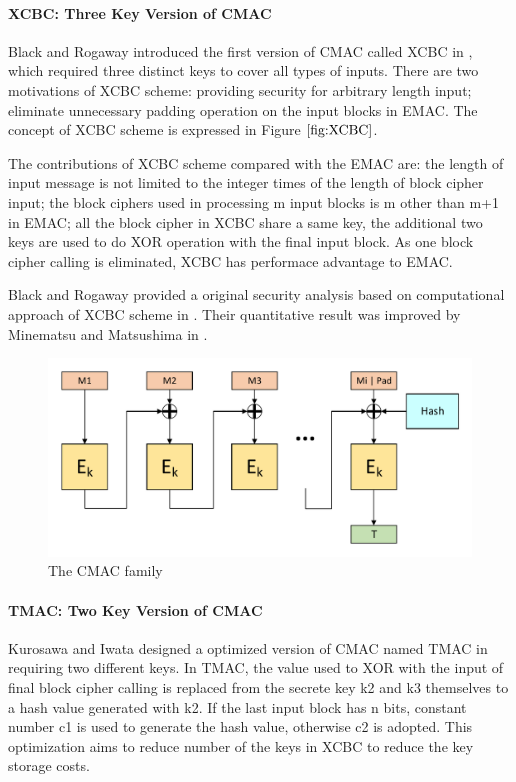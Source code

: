 \documentclass{article}
\begin{document}
\paragraph{XCBC: Three Key Version of CMAC}
Black and Rogaway introduced the first version of CMAC called XCBC in \cite{xcbc}, which required three distinct keys to cover all types of inputs.
There are two motivations of XCBC scheme: providing security for arbitrary length input; eliminate unnecessary padding operation on the input blocks in EMAC. The concept of XCBC scheme is expressed in Figure $\ref{fig:XCBC}$.

The contributions of XCBC scheme compared with the EMAC are: the length of input message is not limited to the integer times of the length of block cipher input; the block ciphers used in processing m input blocks is m other than m+1 in EMAC; all the block cipher in XCBC share a same key, the additional two keys are used to do XOR operation with the final input block. As one block cipher calling is eliminated, XCBC has performace advantage to EMAC.   

Black and Rogaway provided a original security analysis based on computational approach of XCBC scheme in \cite{xcbc}. Their quantitative result was improved by Minematsu and Matsushima in \cite{new}. 

\begin{figure}[htbp]
\centering
\includegraphics[scale=0.5]{./diagrams/cmac.pdf}
\caption{The CMAC family}
\label{fig:TMAC}
\end{figure}
\paragraph{TMAC: Two Key Version of CMAC}
Kurosawa and Iwata designed a optimized version of CMAC named TMAC in \cite{tmac} requiring two different keys.  
In TMAC,  the value used to XOR with the input of final block cipher calling is replaced from the secrete key k2 and k3 themselves to a hash value generated with k2. If the last input block has n bits, constant number c1 is used to generate the hash value, otherwise c2 is adopted. This optimization aims to reduce number of the keys in XCBC to reduce the key storage costs. 
\end{document}
